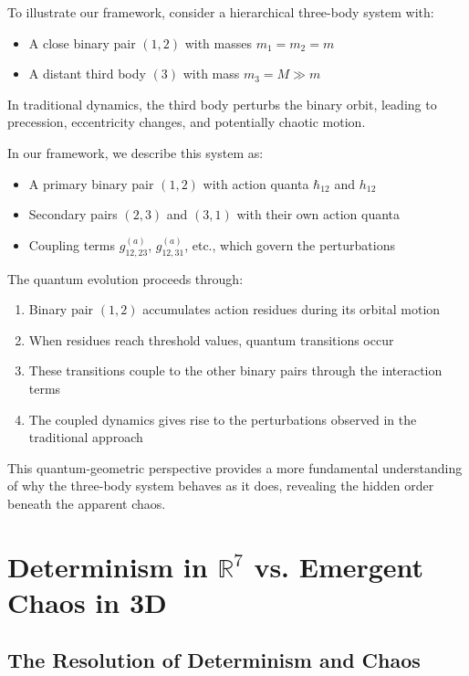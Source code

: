 \documentclass{article}
\begin{document}
To illustrate our framework, consider a hierarchical three-body system with:
\begin{itemize}
\item A close binary pair $(1,2)$ with masses $m_1 = m_2 = m$
\item A distant third body $(3)$ with mass $m_3 = M \gg m$
\end{itemize}

In traditional dynamics, the third body perturbs the binary orbit, leading to precession, eccentricity changes, and potentially chaotic motion.

In our framework, we describe this system as:
\begin{itemize}
\item A primary binary pair $(1,2)$ with action quanta $\hbar_{12}$ and $h_{12}$
\item Secondary pairs $(2,3)$ and $(3,1)$ with their own action quanta
\item Coupling terms $g_{12,23}^{(a)}$, $g_{12,31}^{(a)}$, etc., which govern the perturbations
\end{itemize}

The quantum evolution proceeds through:
\begin{enumerate}
\item Binary pair $(1,2)$ accumulates action residues during its orbital motion
\item When residues reach threshold values, quantum transitions occur
\item These transitions couple to the other binary pairs through the interaction terms
\item The coupled dynamics gives rise to the perturbations observed in the traditional approach
\end{enumerate}

This quantum-geometric perspective provides a more fundamental understanding of why the three-body system behaves as it does, revealing the hidden order beneath the apparent chaos.

\section{Determinism in $\mathbb{R}^7$ vs. Emergent Chaos in 3D}

\subsection{The Resolution of Determinism and Chaos}
\end{document}
